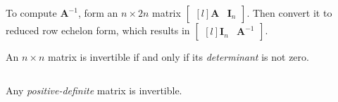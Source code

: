 To compute $\bm{A}^{-1}$, form an $n\times 2n$ matrix $\begin{bmatrix*}[l]
       \bm{A} & \bm{I}_n\end{bmatrix*}$.
Then convert it to reduced row echelon form, which results in $\begin{bmatrix*}[l]
       \bm{I}_n & \bm{A}^{-1}\end{bmatrix*}$.

\begin{theorem}
An $n\times n$ matrix is invertible if and only if its \emph{determinant} is not zero.
\end{theorem}

\begin{theorem}$\ $\vspace{-0.1in}
\begin{center}Any \emph{positive-definite} matrix is invertible.\end{center}
\end{theorem}

